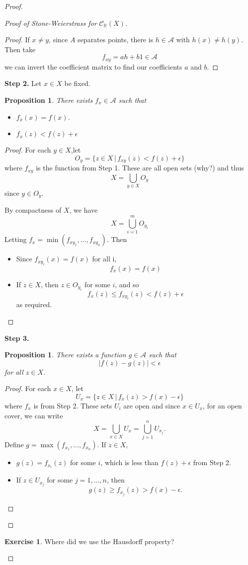 \documentclass[10pt, reqno, oneside]{amsart}
\theoremstyle{plain}%
\newtheorem{prop}[thm]{Proposition}
\theoremstyle{definition}
\newtheorem{exer}[thm]{Exercise}
\theoremstyle{remark}
\newcommand{\R}{\mathbb{R}}
\begin{document}
\begin{proof}
\begin{proof}[Proof of Stone-Weierstrass for $\mathcal{C}_\R(X)$]
\begin{proof}
			If $x \neq y$, since $A$ separates points, there is $h \in \mathcal{A}$ with $h(x) \neq h(y)$.  Then take \[
				f_{xy} = a h + b 1 \in \mathcal{A}
			\] we can invert the coefficient matrix to find our coefficients $a$ and $b$.  
		\end{proof}
		
		\textbf{Step 2.} Let $x \in X$ be fixed.  
		\begin{prop}
			There exists $f_x \in \mathcal{A}$ such that \begin{itemize}
				\item $f_x(x) = f(x)$.  
				\item $f_x(z) < f(z) + \epsilon$
			\end{itemize}
		\end{prop}
		\begin{proof}
			For each $y \in X$,let \[
				O_y = \{ z \in X \, | \, f_{xy}(z) < f(z) + \epsilon \}
			\] where $f_{xy}$ is the function from Step 1.  These are all open sets (why?) and thus \[
				X = \bigcup_{y \in X} O_y
			\] since $y \in O_y$.  
			
			By compactness of $X$, we have \[
				X = \bigcup_{i=1}^m O_{y_i}
			\]  Letting $f_x = \min(f_{xy_1}, \dots, f_{xy_n})$.  Then 
			\begin{itemize}
				\item Since $f_{xy_i}(x) = f(x)$ for all i, \[
					f_x(x) = f(x)
				\]
				\item If $z \in X$, then $z \in O_{y_i}$ for some $i$, and so \[
					f_x(z) \leq f_{x y_i}(z) < f(z) + \epsilon
				\] as required.
			\end{itemize} 
		\end{proof}
		
		\textbf{Step 3.}  \begin{prop}
			There exists a function $g \in \mathcal{A}$ such that \[
				|f(z) - g(z) | < \epsilon
			\] for all $z \in X$.  
		\end{prop}
		\begin{proof}
			For each $x \in X$, let \[
				U_x = \{ z \in X \, | \, f_x(z) > f(x) - \epsilon \} 
			\] where $f_x$ is from Step 2.  These sets $U_i$ are open and since $x \in U_x$, for an open cover, we can write \[
				X = \bigcup_{x \in X} U_x = \bigcup_{j=1}^n U_{x_j}.
			\]  
			Define $g = \max(f_{x_1}, \dots, f_{x_n})$.  If $z \in X$, 
			\begin{itemize}
				\item $g(z) = f_{x_i}(z)$ for some $i$, which is less than $f(z) + \epsilon$ from Step 2.
				\item If $z \in U_{x_j}$ for some $j = 1, \dots, n$, then \[
					g(z) \geq f_{x_j}(z) > f(x) - \epsilon.  
				\]
			\end{itemize}
		\end{proof} 
	\end{proof}
	\begin{exer}
		Where did we use the Hausdorff property?
	\end{exer}
	

\end{proof}
\end{document}
